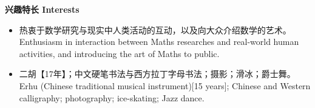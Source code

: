 \documentclass[12pt]{CV_CN} %
\begin{document}
\vspace{1em}
\textbf{兴趣特长 Interests}
\begin{itemize}[topsep=0em, itemsep=0.3em, parsep=0pt, partopsep=1em]
	\item 热衷于数学研究与现实中人类活动的互动，以及向大众介绍数学的艺术。\\
	Enthusiasm in interaction between Maths researches and real-world human activities, and introducing the art of Maths to public. 
	\item 二胡【17年】；中文硬笔书法与西方拉丁字母书法；摄影；滑冰；爵士舞。\\
	Erhu (Chinese traditional musical instrument)[15 years]; Chinese and Western calligraphy; photography; ice-skating; Jazz dance. 
\end{itemize}
\end{document}
